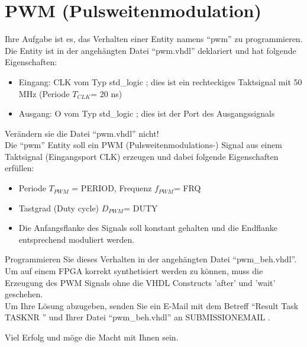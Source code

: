 \documentclass[a4paper,12pt]{article}
\begin{document}
\pagestyle{empty}
\setlength{\parindent}{0em}
\section*{PWM (Pulsweitenmodulation)}

Ihre Aufgabe ist es, das Verhalten einer Entity  namens "`pwm"' zu programmieren. Die Entity ist in der angeh\"angten Datei "`pwm.vhdl"' deklariert und hat folgende Eigenschaften:

\begin{itemize}
\item Eingang:  CLK vom Typ std\_logic ; dies ist ein rechteckiges Taktsignal mit 50 MHz (Periode $T_{CLK}$= 20 ns)
\item Ausgang: O vom Typ std\_logic ; dies ist der Port des Ausgangssignals
\end{itemize}
\begin{center}
\end{center}

Ver\"andern sie die Datei "`pwm.vhdl"' nicht!\\

Die "`pwm"' Entity soll ein PWM (Pulsweitenmodulations-) Signal aus einem Taktsignal (Eingangsport CLK) erzeugen und dabei folgende Eigenschaften erf\"ullen:
\begin{itemize}
\item Periode $T_{PWM}$ = {{PERIOD}}, Frequenz $f_{PWM}$= {{FRQ}}
\item Tastgrad (Duty cycle) $D_{PWM}$= {{DUTY}}
\item Die Anfangsflanke des Signals soll konstant gehalten und die Endflanke entsprechend moduliert werden.
\end{itemize}
\vspace{0.3cm}

Programmieren Sie dieses Verhalten in der angeh\"angten Datei "`pwm\_beh.vhdl"'.
\\

Um auf einem FPGA korrekt synthetisiert werden zu k\"onnen, muss die Erzeugung des PWM Signals ohne die VHDL Constructs 'after' und 'wait' geschehen.
\\

Um Ihre L\"osung abzugeben, senden Sie ein E-Mail mit dem Betreff "`Result Task {{ TASKNR }}"' und Ihrer Datei "`pwm\_beh.vhdl"'  an {{ SUBMISSIONEMAIL }}.

\vspace{0.7cm}

Viel Erfolg und m\"oge die Macht mit Ihnen sein.
\end{document}
